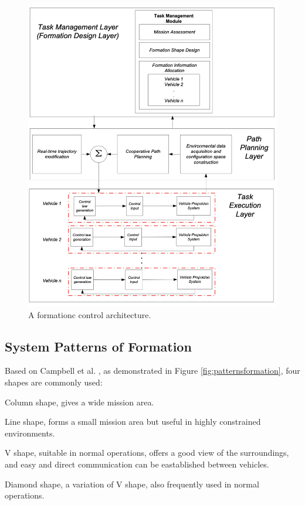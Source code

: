 \documentclass[letterpaper,12pt]{article}
\begin{document}
\begin{figure}
	\centering
	\includegraphics[width=5in]{FormationSystemArchitecture.png}
	\caption{A formationc control architecture.}
	\label{fig:FormationSystemArchitecture} 
\end{figure}

\subsection{System Patterns of Formation}

Based on Campbell et al. \cite{campbell2012review}, as demonstrated in Figure \ref{fig:patternsformation}, four shapes are commonly used:

\begin{compactenum}
	\item Column shape, gives a wide mission area.
	\item Line shape, forms a small mission area but useful in highly constrained environments.
	\item V shape, suitable in normal operations, offers a good view of the surroundings, and easy and direct communication can be eastablished between vehicles.
	\item Diamond shape, a variation of V shape, also frequently used in normal operations.
\end{compactenum}
\end{document}
